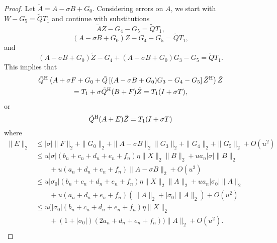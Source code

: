 \documentclass[12pt]{article}
\def\H{{\rm H}}
\begin{document}
\begin{proof}
  Let $\breve{A} = A-\sigma B + G_0$.  Considering errors on $A$, we
  start with $W - G_5 = \tilde{Q}T_1$ and continue with substitutions
  \begin{equation*}
    \breve{A}Z - G_4 - G_5 = \tilde{Q}T_1,
  \end{equation*}
  \begin{equation*}
    (A-\sigma B + G_0)Z - G_4 - G_5 = \tilde{Q}T_1,
  \end{equation*}
  and
  \begin{equation*}
    (A-\sigma B + G_0)\tilde{Z} - G_4 + (A-\sigma B+G_0) G_3 - G_5  = \tilde{Q}T_1.
  \end{equation*}
  This implies that
  \begin{multline*}
    \tilde{Q}^\H \left(A + \sigma F + G_0 + \tilde{Q} \left[(A-\sigma B+G_0) G_3- G_4 -G_5\right] \tilde{Z}^\H\right)
    \tilde{Z} \\
    = T_1 + \sigma \tilde{Q}^\H(B+F) \tilde{Z} = T_1 (I+\sigma T),
  \end{multline*}
  or
  \begin{equation*}
    \tilde{Q}^\H (A+E) \tilde{Z} = T_1(I+\sigma T)
  \end{equation*}
  where
  \begin{align*}
    \|E\|_2 
    & \leq |\sigma| \|F\|_2 + \|G_0\|_2 + \|A-\sigma B\|_2 \|G_3\|_2 + \|G_4\|_2 + \|G_5\|_2 + O(u^2) \\
    & \leq u |\sigma| (b_n + c_n + d_n + e_n + f_n) \eta \|X\|_2 \|B\|_2 + ua_n |\sigma| \|B\|_2 \\
    & \qquad + u(a_n + d_n+e_n+f_n) \|A-\sigma B\|_2 +O(u^2)\\
    & \leq u |\sigma_0| (b_n + c_n + d_n + e_n + f_n) \eta \|X\|_2 \|A\|_2 + ua_n |\sigma_0| \|A\|_2 \\
    & \qquad + u(a_n + d_n+e_n+f_n) (\|A\|_2 + |\sigma_0| \|A\|_2) +O(u^2)\\
    & \leq u \Big(|\sigma_0| (b_n + c_n + d_n + e_n + f_n) \eta \|X\|_2 \\
    & \qquad + (1+|\sigma_0|)(2a_n + d_n+e_n+f_n)\Big) \|A\|_2 +O(u^2).\\
  \end{align*}
\end{proof}



\end{document}
